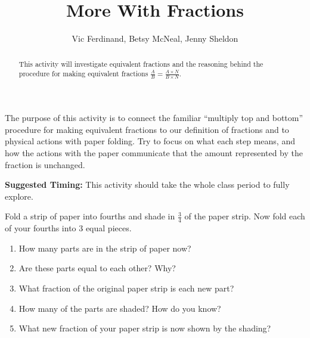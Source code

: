 \documentclass{ximera}
\title{More With Fractions}
\author{Vic Ferdinand, Betsy McNeal, Jenny Sheldon}
\begin{document}
\begin{abstract}
 This activity will investigate equivalent fractions and the reasoning behind the procedure for making equivalent fractions $\frac{A}{B} = \frac{A \times N}{B \times N}$.
\end{abstract}
\maketitle

\begin{instructorIntro}
The purpose of this activity is to connect the familiar ``multiply top and bottom'' procedure for making equivalent fractions to our definition of fractions and to physical actions with paper folding.  Try to focus on what each step means, and how the actions with the paper communicate that the amount represented by the fraction is unchanged.

{\bf Suggested Timing:} This activity should take the whole class period to fully explore.
\end{instructorIntro}


\begin{question}
Fold a strip of paper into fourths and shade in $\frac{3}{4}$ of the paper strip. Now fold each of your fourths into 3 equal pieces.  
\begin{enumerate}
    \item   How many parts are in the strip of paper now?
    \item   Are these parts equal to each other?  Why?
    \item   What fraction of the original paper strip is each new part?
    \item   How many of the parts are shaded?  How do you know?
    \item   What new fraction of your paper strip is now shown by the shading?  
   
\end{enumerate}
\end{question}
\end{document}
